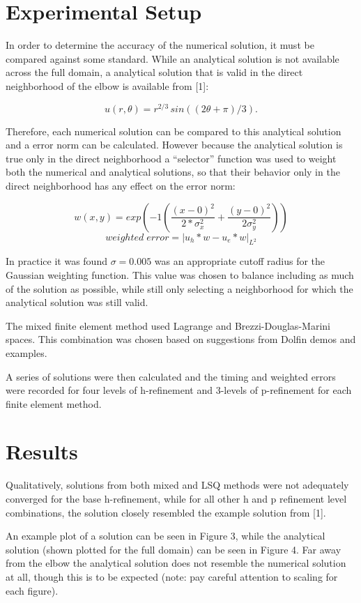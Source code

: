 \documentclass[letterpaper,10pt]{article}
\newcommand{\bes}{\begin{equation*}}
\newcommand{\ees}{\end{equation*}}
\begin{document}
\section*{Experimental Setup}
In order to determine the accuracy of the numerical solution, it must be compared against some standard. While an analytical solution is not available across the full domain, a analytical solution that is valid in the direct neighborhood of the elbow is available from [1]:

\bes u(r,\theta) = r^{2/3} \, sin((2\theta + \pi)/3).\ees

Therefore, each numerical solution can be compared to this analytical solution and a error norm can be calculated. However because the analytical solution is true only in the direct neighborhood a ``selector'' function was used to weight both the numerical and analytical solutions, so that their behavior only in the direct neighborhood has any effect on the error norm:

\bes w(x,y) = exp(-1(\frac{(x-0)^2}{2*\sigma_x^2}+\frac{(y-0)^2}{2\sigma_y^2})) \ees
\bes weighted \;error = |u_h*w-u_e*w|_{L^2}\ees

In practice it was found $\sigma=0.005$ was an appropriate cutoff radius for the Gaussian weighting function. This value was chosen to balance including as much of the solution as possible, while still only selecting a neighborhood for which the analytical solution was still valid.

The mixed finite element method used Lagrange and Brezzi-Douglas-Marini spaces. This combination was chosen based on suggestions from Dolfin demos and examples.

A series of solutions were then calculated and the timing and weighted errors were recorded for four levels of h-refinement and 3-levels of p-refinement for each finite element method.\\

\section*{Results}
Qualitatively, solutions from both mixed and LSQ methods were not adequately converged for the base h-refinement, while for all other h and p refinement level combinations, the solution closely resembled the example solution from [1].

An example plot of a solution can be seen in Figure 3, while the analytical solution (shown plotted for the full domain) can be seen in Figure 4. Far away from the elbow the analytical solution does not resemble the numerical solution at all, though this is to be expected (note: pay careful attention to scaling for each figure).
\end{document}
